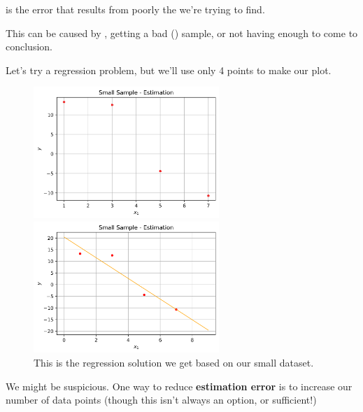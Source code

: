         \begin{definition}
             is the error that results from poorly  the  we're trying to find. 
            
            This can be caused by , getting a bad () sample, or not having enough  to come to conclusion.
        \end{definition}
        
        \miniex Let's try a regression problem, but we'll use only 4 points to make our plot.
        
        \begin{figure}[H]

            \includegraphics[width=70mm,scale=0.5]{images/regression_images/Estimation_Limited_Sample.png}

            \includegraphics[width=70mm,scale=0.5]{images/regression_images/Estimation_Limited_Sample_Regression.png}
        
            \caption*{This is the regression solution we get based on our small dataset.}
        \end{figure}
        
        We might be suspicious. One way to reduce \textbf{estimation error} is to increase our number of data points (though this isn't always an option, or sufficient!)
        

